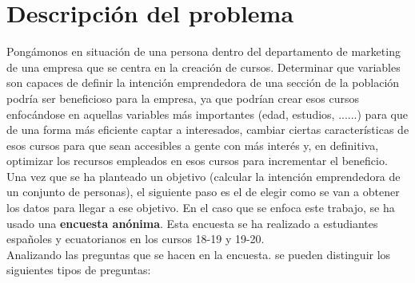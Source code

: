\chapter{Descripción del problema}
\label{sec:problema}
Pongámonos en situación de una persona dentro del departamento de marketing de una empresa que se centra en la creación de cursos. Determinar que variables son capaces de definir la intención emprendedora de una sección de la población podría ser beneficioso para la empresa, ya que podrían crear esos cursos enfocándose en aquellas variables más importantes (edad, estudios, ......) para que de una forma más eficiente captar a interesados, cambiar ciertas características de esos cursos para que sean accesibles a gente con más interés y, en definitiva, optimizar los recursos empleados en esos cursos para incrementar el beneficio.\\
\linebreak
Una vez que se ha planteado un objetivo (calcular la intención emprendedora de un conjunto de personas), el siguiente paso es el de elegir como se van a obtener los datos para llegar a ese objetivo. En el caso que se enfoca este trabajo, se ha usado una \textbf{encuesta anónima}. Esta encuesta se ha realizado a estudiantes españoles y ecuatorianos en los cursos 18-19 y 19-20.\\
\linebreak
Analizando las preguntas que se hacen en la encuesta. se pueden distinguir los siguientes tipos de preguntas:

